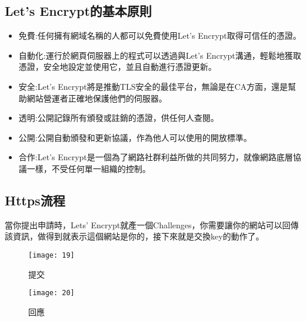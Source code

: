 \renewcommand{\baselinestretch}{20} %
\subsection{Let’s Encrypt的基本原則}
\par
\renewcommand{\baselinestretch}{1} %
\begin{itemize}
	\item 免費:任何擁有網域名稱的人都可以免費使用Let’s Encrypt取得可信任的憑證。
	\item 自動化:運行於網頁伺服器上的程式可以透過與Let’s Encrypt溝通，輕鬆地獲取憑證，安全地設定並使用它，並且自動進行憑證更新。
	\item 安全:Let’s Encrypt將是推動TLS安全的最佳平台，無論是在CA方面，還是幫助網站營運者正確地保護他們的伺服器。
	\item 透明:公開記錄所有頒發或註銷的憑證，供任何人查閱。
	\item 公開:公開自動頒發和更新協議，作為他人可以使用的開放標準。
	\item 合作:Let’s Encrypt是一個為了網路社群利益所做的共同努力，就像網路底層協議一樣，不受任何單一組織的控制。
\end{itemize}
\par

\renewcommand{\baselinestretch}{20} %
\subsection{Https流程}
\par
\renewcommand{\baselinestretch}{1} %
\twelve 當你提出申請時，Lets' Encrypt就產一個Challenges，你需要讓你的網站可以回傳該資訊，做得到就表示這個網站是你的，接下來就是交換key的動作了。
\\
\par
\begin{figure}[hbt!]
\begin{center}
\texttt{[image: 19]}
\caption{\large 提交}\label{fig.提交}
\end{center}
\end{figure}
\begin{figure}[hbt!]
\begin{center}
\texttt{[image: 20]}
\caption{\large 回應}\label{fig.回應}
\end{center}
\end{figure}
\par